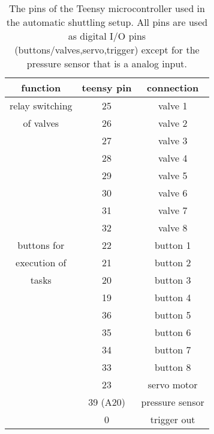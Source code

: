             \begin{table}
                \centering
                \begin{tabular}{|c|c|c|}
                    \hline
                    function & teensy pin & connection\\
                    \hline
                    relay switching & 25 & valve 1\\
                    of valves       & 26 & valve 2\\
                                    & 27 & valve 3\\
                                    & 28 & valve 4\\
                                    & 29 & valve 5\\
                                    & 30 & valve 6\\
                                    & 31 & valve 7\\
                                    & 32 & valve 8\\
                    \hline
                    buttons for     & 22 &button 1 \\
                    execution of                & 21 &button 2 \\
                    tasks                & 20 &button 3 \\
                                    & 19 &button 4 \\
                                    & 36 &button 5 \\
                                    & 35 &button 6 \\
                                    & 34 &button 7 \\
                                    & 33 &button 8 \\
                    \hline
                                    & 23 & servo motor \\
                    \hline
                    & 39 (A20) & pressure sensor\\
                    \hline
                                    & 0 & trigger out\\
                    \hline
                \end{tabular}
                \caption[Shuttling system pin layout]{The pins of the Teensy microcontroller used in the automatic shuttling setup. All pins are used as digital I/O pins (buttons/valves,servo,trigger) except for the pressure sensor that is a analog input.}
                \label{table:matMeth:connectionsRelaisBox}
            \end{table}
